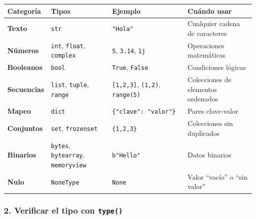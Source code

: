 \documentclass[
  doc,
  floatsintext,
  longtable,
  a4paper,
  nolmodern,
  notxfonts,
  notimes,
  12pt,
  colorlinks=true,linkcolor=blue,citecolor=blue,urlcolor=blue]{apa7}
\newcounter{none} %
\begin{document}
{\def\LTcaptype{none} %
\begin{longtable}[]{@{}
  >{\raggedright\arraybackslash}p{}
  >{\raggedright\arraybackslash}p{}
  >{\raggedright\arraybackslash}p{}
  >{\raggedright\arraybackslash}p{}@{}}
\toprule\noalign{}
\begin{minipage}[b]{\linewidth}\raggedright
Categoría
\end{minipage} & \begin{minipage}[b]{\linewidth}\raggedright
Tipos
\end{minipage} & \begin{minipage}[b]{\linewidth}\raggedright
Ejemplo
\end{minipage} & \begin{minipage}[b]{\linewidth}\raggedright
Cuándo usar
\end{minipage} \\
\midrule\noalign{}
\endhead
\bottomrule\noalign{}
\endlastfoot
\textbf{Texto} & \texttt{str} & \texttt{"Hola"} & Cualquier cadena de
caracteres \\
\textbf{Números} & \texttt{int}, \texttt{float}, \texttt{complex} &
\texttt{5}, \texttt{3.14}, \texttt{1j} & Operaciones matemáticas \\
\textbf{Booleanos} & \texttt{bool} & \texttt{True}, \texttt{False} &
Condiciones lógicas \\
\textbf{Secuencias} & \texttt{list}, \texttt{tuple}, \texttt{range} &
\texttt{{[}1,2,3{]}}, \texttt{(1,2)}, \texttt{range(5)} & Colecciones de
elementos ordenados \\
\textbf{Mapeo} & \texttt{dict} & \texttt{\{"clave":\ "valor"\}} & Pares
clave-valor \\
\textbf{Conjuntos} & \texttt{set}, \texttt{frozenset} &
\texttt{\{1,2,3\}} & Colecciones sin duplicados \\
\textbf{Binarios} & \texttt{bytes}, \texttt{bytearray},
\texttt{memoryview} & \texttt{b"Hello"} & Datos binarios \\
\textbf{Nulo} & \texttt{NoneType} & \texttt{None} & Valor ``vacío'' o
``sin valor'' \\
\end{longtable}
}

\subsubsection{\texorpdfstring{2. Verificar el tipo con
\texttt{type()}}{2. Verificar el tipo con type()}}\label{verificar-el-tipo-con-type}
\end{document}
